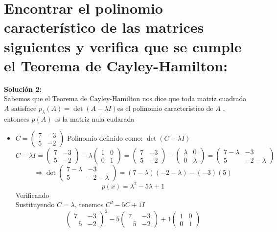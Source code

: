 \section{Encontrar el polinomio característico de las matrices siguientes y verifica que se cumple el
Teorema de Cayley-Hamilton:}
\textbf{Soluci\'on 2:}\\
Sabemos que el Teorema de Cayley-Hamilton nos dice que toda matriz cuadrada $A$ satisface  $p_\lambda(A)=\det(A-\lambda I)$es el polinomio característico de $A$ , entonces $p(A)$ es la matriz nula cudarada
\begin{itemize}

    \item $C=\begin{pmatrix}7&-3\\ 5&-2\end{pmatrix}$
    Polinomio definido como: $\det \left(C-\lambda I\right)$
    $$C-\lambda I=\begin{pmatrix}7&-3\\ 5&-2\end{pmatrix}-\lambda\begin{pmatrix}1&0\\ 0&1\end{pmatrix}=\begin{pmatrix}7&-3\\ 5&-2\end{pmatrix}-\begin{pmatrix}\lambda&0\\ 0&\lambda\end{pmatrix}=\begin{pmatrix}7-\lambda&-3\\ 5&-2-\lambda\end{pmatrix}$$
    $$\Longrightarrow \det \begin{pmatrix}7-\lambda&-3\\ 5&-2-\lambda\end{pmatrix}=\left(7-\lambda\right)\left(-2-\lambda\right)-\left(-3\right)(5)$$
    $$p(x)=\lambda^2-5\lambda+1$$
    Verificando\\
    Sustituyendo $C=\lambda$, tenemos $C^2-5C+1I$ 
    $$\begin{pmatrix}7&-3\\ \:\:\:5&-2\end{pmatrix}^2-5\begin{pmatrix}7&-3\\ \:\:\:5&-2\end{pmatrix}+1\begin{pmatrix}1&0\\0&1\end{pmatrix}$$

\end{itemize}
